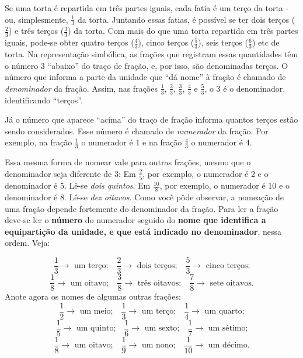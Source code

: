 Se uma torta é repartida em três partes iguais, cada fatia é um terço da torta - ou, simplesmente, $\frac{1}{3}$ da torta. Juntando essas fatias, é possível se ter dois terços ($\frac{2}{3}$) e três terços ($\frac{3}{3}$) da torta. Com mais do que uma torta repartida em três partes iguais, pode-se obter quatro terços ($\frac{4}{3}$), cinco terços ($\frac{5}{3}$), seis terços ($\frac{6}{3}$) etc de torta. Na representação simbólica, as frações que registram essas quantidades têm o número 3 ``abaixo'' do traço de fração, e, por isso, são denominadas terços. O número que informa a parte da unidade que ``dá nome'' à fração é chamado de {\it denominador} da fração. Assim, nas frações $\frac{1}{3}$, $\frac{2}{3}$, $\frac{3}{3}$,  $\frac{4}{3}$ e $\frac{5}{3}$, o 3 é o denominador, identificando ``terços''.

Já o número que aparece ``acima'' do traço de fração informa quantos terços estão sendo considerados. Esse número é chamado de {\it numerador} da fração. Por exemplo, na fração $\frac{1}{3}$ o numerador é 1 e na fração $\frac{4}{3}$ o numerador é 4.

Essa mesma forma de nomear vale para outras frações, mesmo que o denominador seja diferente de 3: \newline
Em $\frac{2}{5}$, por exemplo, o numerador é 2 e o denominador é 5. Lê-se {\it dois quintos}.\newline
Em $\frac{10}{8}$, por exemplo, o numerador é 10 e o denominador é 8. Lê-se {\it dez oitavos}. \newline
Como você pôde observar, a nomeação de uma fração depende fortemente do denominador da fração. Para ler a fração deve-se ler o {\bf número} do numerador seguido do {\bf nome que identifica a equipartição da unidade, e que está indicado no denominador}, nessa ordem. Veja:

$$\frac{1}{3}\rightarrow \text{ um terço;} \quad \frac{2}{3}\rightarrow \text{ dois terços;} \quad \frac{5}{3}\rightarrow \text{ cinco terços;}$$
$$\frac{1}{8}\rightarrow \text{ um oitavo;} \quad \frac{3}{8}\rightarrow \text{ três oitavos;} \quad \frac{7}{8}\rightarrow \text{ sete oitavos.}$$
Anote agora os nomes de algumas outras frações:
$$\frac{1}{2}\rightarrow \text{  um meio;} \quad \frac{1}{3}\rightarrow\text{  um terço;} \quad \frac{1}{4}\rightarrow\text{  um quarto;}$$
$$\frac{1}{5}\rightarrow\text{  um quinto;}\quad \frac{1}{6}\rightarrow\text{  um sexto;} \quad \frac{1}{7}\rightarrow\text{  um sétimo;}$$
$$\frac{1}{8}\rightarrow\text{  um oitavo;}\quad \frac{1}{9}\rightarrow\text{  um nono;}\quad \frac{1}{10}\rightarrow\text{  um décimo.}$$

